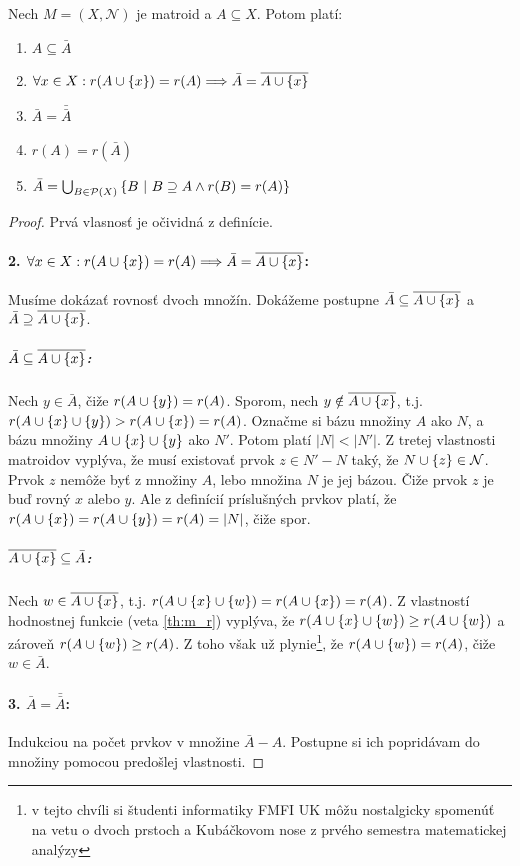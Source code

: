 \begin{theorem}
\label{th:closure}
Nech $M = (X, \mathcal{N})$ je matroid a $A \subseteq X$. Potom platí:
\begin{enumerate}
    \item $A \subseteq \bar{A}$
    \item $\forall x \in X: r(A \cup \left\{x\right\}) = r(A) \Longrightarrow \bar{A} = \overline{A \cup \left\{x\right\}}$
    \item $\bar{A} = \bar{\bar{A}}$
    \item $r(A) = r(\bar{A})$
    \item $\bar{A} = \bigcup_{B \in \mathcal{P}(X)} \left\{B ~|~ B \supseteq A \wedge r(B) = r(A)\right\}$
\end{enumerate}
\end{theorem}
\begin{proof}
Prvá vlasnosť je očividná z definície.
\paragraph{2. $\forall x \in X: r(A \cup \left\{x\right\}) = r(A) \Longrightarrow \bar{A} = \overline{A \cup \left\{x\right\}}$:}
Musíme dokázať rovnosť dvoch množín.
Dokážeme postupne $\bar{A} \subseteq \overline{A \cup \left\{x\right\}}$ a $\bar{A} \supseteq \overline{A \cup \left\{x\right\}}$.
\subparagraph{$\bar{A} \subseteq \overline{A \cup \left\{x\right\}}$:} 
Nech $y \in \bar{A}$, čiže $r(A \cup \left\{y\right\}) = r(A)$.
Sporom, nech $y \notin \overline{A \cup \left\{x\right\}}$, t.j. $r(A \cup \left\{x\right\} \cup \left\{y\right\}) > r(A \cup \left\{x\right\}) = r(A)$.
Označme si bázu množiny $A$ ako $N$, a bázu množiny $A \cup \left\{x\right\} \cup \left\{y\right\}$ ako $N'$.
Potom platí $|N| < |N'|$.
Z tretej vlastnosti matroidov vyplýva, že musí existovať prvok $z \in N' - N$ taký, že $N \cup \left\{z\right\} \in \mathcal{N}$.
Prvok $z$ nemôže byť z množiny $A$, lebo množina $N$ je jej bázou.
Čiže prvok $z$ je buď rovný $x$ alebo $y$.
Ale z definícií príslušných prvkov platí, že $r(A \cup \left\{x\right\}) = r(A \cup \left\{y\right\}) = r(A) = |N|$, čiže spor.
\subparagraph{$\overline{A \cup \left\{x\right\}}\subseteq \bar{A} $:} Nech $w \in \overline{A \cup \left\{x\right\}}$, t.j. $r(A \cup \left\{x\right\} \cup \left\{w\right\}) = r(A \cup \left\{x\right\}) = r(A)$.
Z vlastností hodnostnej funkcie (veta \ref{th:m_r}) vyplýva, že $r(A \cup \left\{x\right\} \cup \left\{w\right\}) \geq r(A \cup\left\{w\right\})$ a zároveň $r(A \cup\left\{w\right\}) \geq r(A)$.
Z toho však už plynie\footnote{v tejto chvíli si študenti informatiky FMFI UK môžu nostalgicky spomenúť na vetu o dvoch prstoch a Kubáčkovom nose z prvého semestra matematickej analýzy}, že $r(A \cup \left\{w\right\}) = r(A)$, čiže $w \in \bar{A}$.
\paragraph{3. $\bar{A} = \bar{\bar{A}}$:} Indukciou na počet prvkov v množine $\bar{A} - A$.
Postupne si ich popridávam do množiny pomocou predošlej vlastnosti.

\end{proof}
